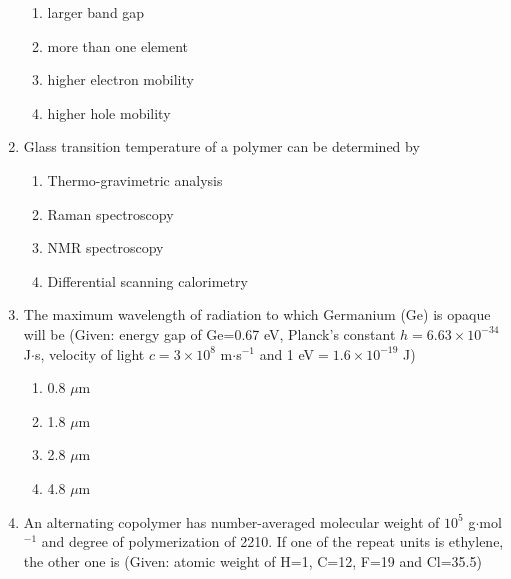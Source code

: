 \documentclass[journal,12pt,onecolumn]{IEEEtran}
\begin{document}
\begin{enumerate}[label=\arabic*)]
\begin{enumerate}[label=\alph*)]
\item larger band gap
\item more than one element
\item higher electron mobility
\item higher hole mobility
\end{enumerate}

\vspace{0.5cm}

\item Glass transition temperature of a polymer can be determined by
\hfill{} \\

\vspace{0.2cm}
\begin{enumerate}[label=\alph*)]
\item Thermo-gravimetric analysis
\item Raman spectroscopy
\item NMR spectroscopy
\item Differential scanning calorimetry
\end{enumerate}

\vspace{0.5cm}

\item The maximum wavelength of radiation to which Germanium (Ge) is opaque will be (Given: energy gap of Ge=0.67 eV, Planck's constant $h=6.63\times10^{-34}$ J$\cdot$s, velocity of light $c=3\times10^{8}$ m$\cdot$s$^{-1}$ and 1 eV$=1.6\times10^{-19}$ J)
\hfill{} \\

\vspace{0.2cm}
\begin{enumerate}[label=\alph*)]
\item 0.8 $\mu$m
\item 1.8 $\mu$m
\item 2.8 $\mu$m
\item 4.8 $\mu$m
\end{enumerate}

\vspace{0.5cm}

\item An alternating copolymer has number-averaged molecular weight of $10^{5}$ g$\cdot$mol$^{-1}$ and degree of polymerization of 2210. If one of the repeat units is ethylene, the other one is (Given: atomic weight of H=1, C=12, F=19 and Cl=35.5)
\hfill{} \\


\end{enumerate}
\end{document}
